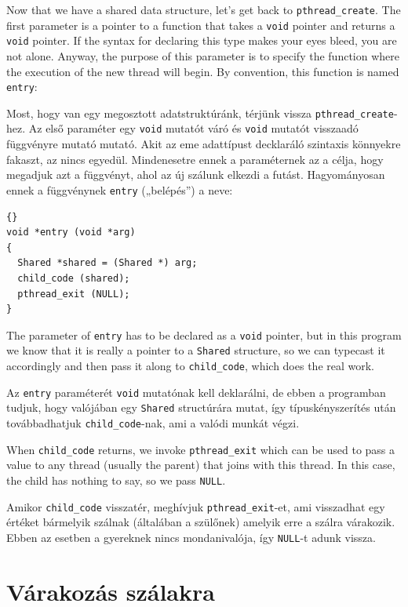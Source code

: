 \documentclass{book}
\begin{document}
Now that we have a shared data structure, let's get back to
{\tt pthread\_create}.
The first parameter is a pointer to a function that takes
a {\tt void} pointer and returns a {\tt void} pointer.  If the syntax
for declaring this type makes your eyes bleed, you are not alone.
Anyway, the purpose of this parameter is to specify the function where
the execution of the new thread will begin.  By convention, this
function is named {\tt entry}:

Most, hogy van egy megosztott adatstruktúránk, térjünk vissza {\tt pthread\_create}-hez.
Az első paraméter egy {\tt void} mutatót váró és {\tt void}
mutatót visszaadó függvényre mutató mutató. Akit az eme adattípust
decklaráló szintaxis könnyekre fakaszt, az nincs egyedül.
Mindenesetre ennek a paraméternek az a célja, hogy megadjuk azt a függvényt,
ahol az új szálunk elkezdi a futást. Hagyományosan ennek
a függvénynek {\tt entry} („belépés”) a neve:

\begin{lstlisting}[title={}]{}
void *entry (void *arg)
{
  Shared *shared = (Shared *) arg;
  child_code (shared);
  pthread_exit (NULL);
}
\end{lstlisting}

The parameter of {\tt entry} has to be declared as a {\tt void}
pointer, but in this program we know that it is really a pointer to a
{\tt Shared} structure, so we can typecast it accordingly and then
pass it along to {\tt child\_code}, which does the real work.

Az {\tt entry} paraméterét {\tt void} mutatónak kell deklarálni,
de ebben a programban tudjuk, hogy valójában egy {\tt Shared} structúrára
mutat, így típuskényszerítés után továbbadhatjuk {\tt child\_code}-nak,
ami a valódi munkát végzi.

When {\tt child\_code} returns, we invoke {\tt pthread\_exit}
which can be used to pass a value to any thread (usually the
parent) that joins with this thread.  In this case, the child
has nothing to say, so we pass {\tt NULL}.

Amikor {\tt child\_code} visszatér, meghívjuk {\tt pthread\_exit}-et,
ami visszadhat egy értéket bármelyik szálnak (általában a szülőnek)
amelyik erre a szálra várakozik. Ebben az esetben a gyereknek
nincs mondanivalója, így {\tt NULL}-t adunk vissza.

\section{Várakozás szálakra}
\end{document}
